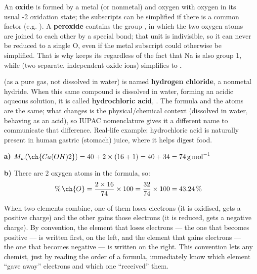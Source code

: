 \documentclass[11pt,a4paper]{article}
\begin{document}
\begin{solucioneng}
An \textbf{oxide} is formed by a metal (or nonmetal) and oxygen with oxygen in its usual -2 oxidation state; the subscripts can be simplified if there is a common factor (e.g. ). A \textbf{peroxide} contains the group , in which the two oxygen atoms are joined to each other by a special bond; that  unit is indivisible, so it can never be reduced to a single O, even if the metal subscript could otherwise be simplified. That is why  keeps its  regardless of the fact that Na is also group 1, while  (two separate, independent oxide ions) simplifies to .
\end{solucioneng}

\begin{solucioneng}
 (as a pure gas, not dissolved in water) is named \textbf{hydrogen chloride}, a nonmetal hydride. When this same compound is dissolved in water, forming an acidic aqueous solution, it is called \textbf{hydrochloric acid}, . The formula and the atoms are the same; what changes is the physical/chemical context (dissolved in water, behaving as an acid), so IUPAC nomenclature gives it a different name to communicate that difference. Real-life example: hydrochloric acid  is naturally present in human gastric (stomach) juice, where it helps digest food.
\end{solucioneng}

\begin{solucioneng}
\textbf{a)} $M_w(\ch{Ca(OH)2}) = 40 + 2\times(16+1) = 40 + 34 = \qty{74}{\g\per\mole}$

\textbf{b)} There are 2 oxygen atoms in the formula, so:
\begin{equation*}
    \%\,\ch{O} = \dfrac{2 \times 16}{74} \times 100 = \dfrac{32}{74}\times 100 = 43.24\,\%
\end{equation*}
\end{solucioneng}

\begin{solucioneng}
When two elements combine, one of them loses electrons (it is oxidised, gets a positive charge) and the other gains those electrons (it is reduced, gets a negative charge). By convention, the element that loses electrons --- the one that becomes positive --- is written first, on the left, and the element that gains electrons --- the one that becomes negative --- is written on the right. This convention lets any chemist, just by reading the order of a formula, immediately know which element ``gave away'' electrons and which one ``received'' them.
\end{solucioneng}
\end{document}
